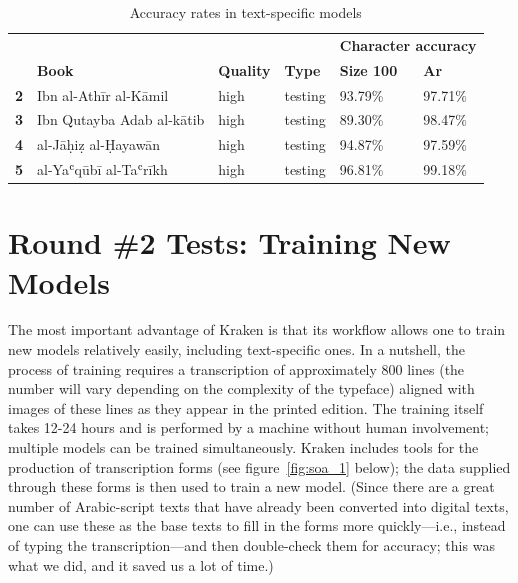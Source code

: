 \begin{table}[h!]
\begin{minipage}{\textwidth}
\begin{center}
\caption{Accuracy rates in text-specific models}
\label{tab:soa_tab4}
\renewcommand*{\thefootnote}{\alph{footnote}}
\begin{tabularx}{\textwidth}{lXllll} \toprule
& & & & \multicolumn{2}{c}{\textbf{Character accuracy}}\\
\cline{5-6}
& \textbf{Book}\footnotemark[1] & \textbf{Quality} & \textbf{Type} & \textbf{Size 100} & \textbf{Ar}\footnotemark[2]\\
\midrule
\textbf{2} & Ibn al-Athīr \scriptsize{al-Kāmil} &  	  high\footnotemark[3] & testing & 93.79\% & 97.71\%\\
\textbf{3} & Ibn Qutayba \scriptsize{Adab al-kātib} & high\footnotemark[3] & testing & 89.30\% & 98.47\%\\
\textbf{4} & al-Jāḥiẓ \scriptsize{al-Ḥayawān} & 	  high\footnotemark[3] & testing & 94.87\% & 97.59\%\\
\textbf{5} & al-Yaʿqūbī \scriptsize{al-Taʿrīkh} & 	  high\footnotemark[3] & testing & 96.81\% & 99.18\% \\
\bottomrule
\end{tabularx}
\end{center}
\renewcommand\footnoterule{}
\end{minipage}
\end{table}

\section{Round \#2 Tests: Training New Models}

The most important advantage of Kraken is that its workflow allows one to train
new models relatively easily, including text-specific ones. In a nutshell, the
process of training requires a transcription of approximately 800 lines (the
number will vary depending on the complexity of the typeface) aligned with
images of these lines as they appear in the printed edition. The training
itself takes 12-24 hours and is performed by a machine without human
involvement; multiple models can be trained simultaneously. Kraken includes
tools for the production of transcription forms (see figure~\ref{fig:soa_1} below); the data
supplied through these forms is then used to train a new model. (Since there
are a great number of Arabic-script texts that have already been converted into
digital texts, one can use these as the base texts to fill in the forms more
quickly—i.e., instead of typing the transcription—and then double-check them
for accuracy; this was what we did, and it saved us a lot of time.)


